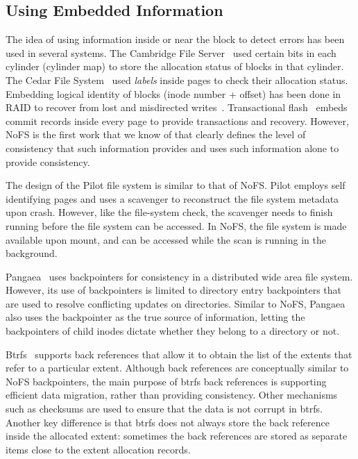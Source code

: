 \subsection{Using Embedded Information}
\label{sec-related-embedded}

The idea of using information inside or near the block to detect
errors has been used in several systems. The Cambridge File
Server~\cite{Dion80-CFS} used certain bits in each cylinder (cylinder
map) to store the allocation status of blocks in that cylinder. The
Cedar File System~\cite{hagmann87-cedar} used \textit{labels} inside
pages to check their allocation status. Embedding logical identity of
blocks (inode number + offset) has been done in RAID to recover from
lost and misdirected writes~\cite{KrioukovEtAl08-FAST}. Transactional
flash~\cite{Prabhakaran+08-txflash} embeds commit records inside every
page to provide transactions and recovery. However, NoFS is the first
work that we know of that clearly defines the level of consistency
that such information provides and uses such information alone to
provide consistency.

The design of the Pilot file system \cite{RedellEtAl80-Pilot} is
similar to that of NoFS. Pilot employs self identifying pages and uses
a scavenger to reconstruct the file system metadata upon crash.
However, like the file-system check, the scavenger needs to finish
running before the file system can be accessed. In NoFS, the file
system is made available upon mount, and can be accessed while the
scan is running in the background.

Pangaea~\cite{SaitoEtAl02-Pangaealocal} uses backpointers for
consistency in a distributed wide area file system. However, its use
of backpointers is limited to directory entry backpointers that are
used to resolve conflicting updates on directories. Similar to NoFS,
Pangaea also uses the backpointer as the true source of information,
letting the backpointers of child inodes dictate whether they belong
to a directory or not.

Btrfs~\cite{Mason07-btrfs} supports back references that allow it to
obtain the list of the extents that refer to a particular extent.
Although back references are conceptually similar to NoFS
backpointers, the main purpose of btrfs back references is supporting
efficient data migration, rather than providing consistency. Other
mechanisms such as checksums are used to ensure that the data is not
corrupt in btrfs. Another key difference is that btrfs does not always
store the back reference inside the allocated extent: sometimes the
back references are stored as separate items close to the extent
allocation records.

